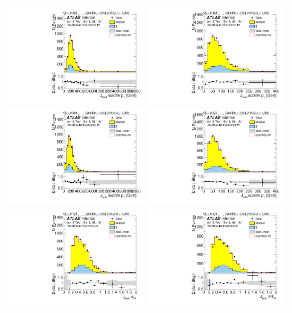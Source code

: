 \begin{figure}[htbp!]
\begin{center}
\includegraphics[width=0.32\textwidth,angle=-90]{figures/boosted/Sideband/b77_ThreeTag_Sideband_leadHCand_trk0_Pt.pdf}
\includegraphics[width=0.32\textwidth,angle=-90]{figures/boosted/Sideband/b77_ThreeTag_Sideband_leadHCand_trk1_Pt.pdf}\\
\includegraphics[width=0.32\textwidth,angle=-90]{figures/boosted/Sideband/b77_ThreeTag_Sideband_sublHCand_trk0_Pt.pdf}
\includegraphics[width=0.32\textwidth,angle=-90]{figures/boosted/Sideband/b77_ThreeTag_Sideband_sublHCand_trk1_Pt.pdf}\\
\includegraphics[width=0.32\textwidth,angle=-90]{figures/boosted/Sideband/b77_ThreeTag_Sideband_leadHCand_trk_dr.pdf}
\includegraphics[width=0.32\textwidth,angle=-90]{figures/boosted/Sideband/b77_ThreeTag_Sideband_sublHCand_trk_dr.pdf}

\end{center}
\end{figure}
